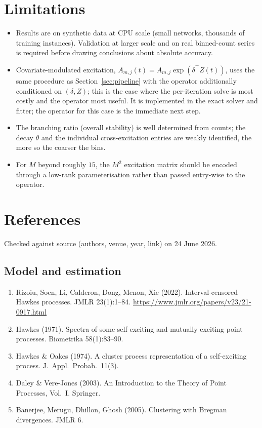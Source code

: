 \documentclass[11pt]{article}
\begin{document}
\section{Limitations}
\label{sec:limits}

\begin{itemize}[leftmargin=1.3em,itemsep=2pt]
\item Results are on synthetic data at CPU scale (small networks, thousands of training
instances). Validation at larger scale and on real binned-count series is required
before drawing conclusions about absolute accuracy.
\item Covariate-modulated excitation, $A_{m,j}(t)=A_{m,j}\exp(\delta^\top Z(t))$, uses
the same procedure as Section~\ref{sec:pipeline} with the operator additionally
conditioned on $(\delta, Z)$; this is the case where the per-iteration solve is most
costly and the operator most useful. It is implemented in the exact solver and fitter;
the operator for this case is the immediate next step.
\item The branching ratio (overall stability) is well determined from counts; the decay
$\theta$ and the individual cross-excitation entries are weakly identified, the more so
the coarser the bins.
\item For $M$ beyond roughly $15$, the $M^2$ excitation matrix should be encoded
through a low-rank parameterisation rather than passed entry-wise to the operator.
\end{itemize}

\section{References}

Checked against source (authors, venue, year, link) on 24 June 2026.

\subsection*{Model and estimation}
\begin{enumerate}[leftmargin=1.6em,itemsep=2pt]
\item Rizoiu, Soen, Li, Calderon, Dong, Menon, Xie (2022). Interval-censored Hawkes
processes. JMLR 23(1):1--84. \url{https://www.jmlr.org/papers/v23/21-0917.html}
\item Hawkes (1971). Spectra of some self-exciting and mutually exciting point
processes. Biometrika 58(1):83--90.
\item Hawkes \& Oakes (1974). A cluster process representation of a self-exciting
process. J.\ Appl.\ Probab.\ 11(3).
\item Daley \& Vere-Jones (2003). An Introduction to the Theory of Point Processes,
Vol.~I. Springer.
\item Banerjee, Merugu, Dhillon, Ghosh (2005). Clustering with Bregman divergences. JMLR 6.
\end{enumerate}
\end{document}
